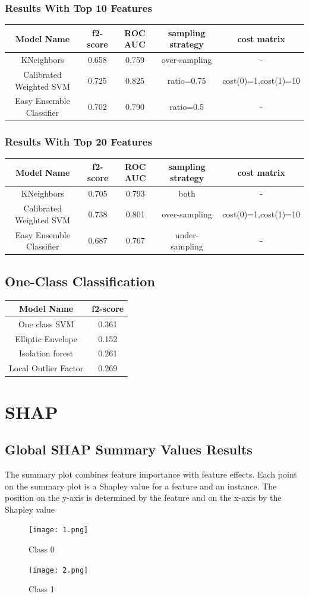 \documentclass{article}
\begin{document}
 \subsubsection{Results With Top 10 Features}
\begin{tabular}{|c|c|c|c|c|} 
 \hline
 Model Name&f2-score&ROC AUC&sampling strategy& cost matrix\\ 
 \hline
KNeighbors &0.658 &0.759&over-sampling&-\\
 \hline
Calibrated Weighted SVM &0.725 &0.825&ratio=0.75&cost(0)=1,cost(1)=10\\
 \hline
Easy Ensemble Classifier &0.702 &0.790&ratio=0.5&-\\ 
 \hline
\end{tabular}
 \subsubsection{Results With Top 20 Features}
\begin{tabular}{|c|c|c|c|c|} 
 \hline
 Model Name&f2-score&ROC AUC&sampling strategy& cost matrix\\ 
 \hline
KNeighbors&0.705 &0.793&both&-\\
 \hline
Calibrated Weighted SVM&0.738 &0.801&over-sampling&cost(0)=1,cost(1)=10\\
 \hline
Easy Ensemble Classifier&0.687 &0.767&under-sampling&-\\ 
 \hline
\end{tabular}

\subsection{One-Class Classification}
\begin{tabular}{|c|c|} 
\hline
Model Name&f2-score\\
\hline
One class SVM&0.361\\
\hline
Elliptic Envelope&0.152\\
\hline
Isolation forest&0.261\\
\hline
Local Outlier Factor&0.269\\
\hline
\end{tabular}
\section{SHAP}
\subsection{Global SHAP Summary Values Results}
The summary plot combines feature importance with feature effects. Each point on the summary plot is a Shapley value for a feature and an instance. The position on the y-axis is determined by the feature and on the x-axis by the Shapley value
\begin{figure}[H]
\centering
\texttt{[image: 1.png]}
\caption{Class 0}
\end{figure}
\begin{figure}[H]
\centering
\texttt{[image: 2.png]}
\caption{Class 1}
\end{figure}
\end{document}
